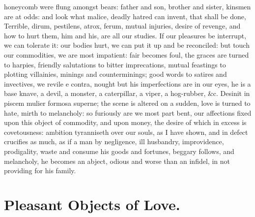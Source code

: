 {honeycomb were flung amongst bears: father and son, brother and sister,
kinsmen are at odds: and look what malice, deadly hatred can invent,
that shall be done, Terrible, dirum, pestilens, atrox, ferum, mutual
injuries, desire of revenge, and how to hurt them, him and his, are all
our studies. If our pleasures be interrupt, we can tolerate it: our
bodies hurt, we can put it up and be reconciled: but touch our
commodities, we are most impatient: fair becomes foul, the graces are
turned to harpies, friendly salutations to bitter imprecations, mutual
feastings to plotting villainies, minings and counterminings; good
words to satires and invectives, we revile e contra, nought but his
imperfections are in our eyes, he is a base knave, a devil, a monster,
a caterpillar, a viper, a hog-rubber, \&c. Desinit in piscem mulier
formosa superne; the scene is altered on a sudden, love is turned
to hate, mirth to melancholy: so furiously are we most part bent, our
affections fixed upon this object of commodity, and upon money, the
desire of which in excess is covetousness: ambition tyranniseth over
our souls, as I have shown, and in defect crucifies as much, as
if a man by negligence, ill husbandry, improvidence, prodigality, waste
and consume his goods and fortunes, beggary follows, and melancholy, he
becomes an abject, odious and worse than an infidel, in not
providing for his family.

\section{Pleasant Objects of Love.}

}
